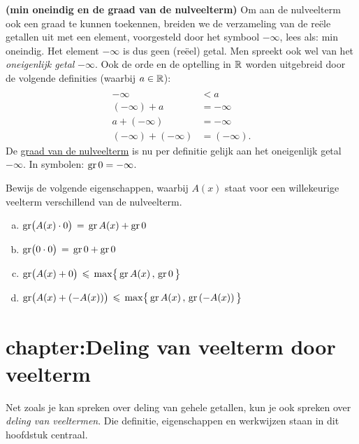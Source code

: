 \documentclass{ximera}
\begin{document}
\begin{Uitbreiding}
\begin{exercise} 
\label{oefgraadnulveelterm}
{\bf (min oneindig en de graad van de nulveelterm)} 
Om aan de nulveelterm ook een graad te kunnen toekennen, breiden we de verzameling van de re\"ele getallen uit met een element, voorgesteld door het symbool $- \infty$, lees als: min oneindig. Het element $-\infty$ is dus geen (re\"eel) getal. Men spreekt ook wel van het {\em oneigenlijk getal} $-\infty$. Ook de orde en de optelling in $\mathbb{R}$ worden uitgebreid door de volgende definities (waarbij $a \in \mathbb{R}$):
\[
\begin{aligned}
\\[-0.5cm]
-\infty & < a \\
(-\infty) + a & = -\infty \\
a + (-\infty) & = -\infty \\
(-\infty) + (-\infty) & = (-\infty).
\end{aligned}
\]
De \underline{graad van de nulveelterm} is nu per definitie gelijk aan het oneigenlijk getal $-\infty$. In symbolen: $\operatorname{gr} 0 = - \infty$.

Bewijs de volgende eigenschappen, waarbij $A(x)$ staat voor een willekeurige veelterm verschillend van de nulveelterm.
\begin{enumerate}[(a)]
\item
$\operatorname{gr}\bigl( A(x) \cdot 0 \bigr) \, = \, \operatorname{gr} A(x) + \operatorname{gr} 0$
\item
$\operatorname{gr}\bigl( 0 \cdot 0 \bigr) \, = \, \operatorname{gr} 0 + \operatorname{gr} 0$
\item
$\displaystyle \operatorname{gr}\bigl( A(x) + 0 \bigr) \, \leqslant \, \max \bigl\{ \,\operatorname{gr} A(x)\, , \, \operatorname{gr} 0 \, \bigr\}$
\item
$\displaystyle \operatorname{gr}\bigl( A(x) + (-A(x)) \bigr) \, \leqslant \, \max \bigl\{ \,\operatorname{gr} A(x)\, , \, \operatorname{gr} \left(-A(x)\right) \, \bigr\}$
\end{enumerate}
\end{exercise} 
\end{Uitbreiding}

\section{chapter:Deling van veelterm door veelterm}\label{hoofdstuk:2}

Net zoals je kan spreken over deling van gehele getallen, kun je ook spreken over {\em deling van veeltermen}. Die definitie, eigenschappen en werkwijzen staan in dit hoofdstuk centraal. 
\end{document}

